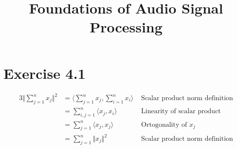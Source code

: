 \documentclass[12pt]{article}
\title{Foundations of Audio Signal Processing\\ \ass}
\author{\auth}
\begin{document}
	\maketitle
	\section*{Exercise 4.1}
	\begin{alignat*}{3}
	\Vert \sum_{j=1}^{n} x_j\Vert^2 &= \langle\sum_{j=1}^{n} x_j, \sum_{i=1}^{n} x_i\rangle & \text{ Scalar product norm definition}\\
	&=\sum_{i, j=1}^{n} \langle x_j, x_i\rangle & \text{ Linearity of scalar product}\\
	&=\sum_{j=1}^{n} \langle x_j, x_j\rangle & \text{ Ortogonality of $x_j$}\\
	&=\sum_{j=1}^{n} \Vert x_j \Vert^2 & \text{ Scalar product norm definition}
	\end{alignat*}
\end{document}
